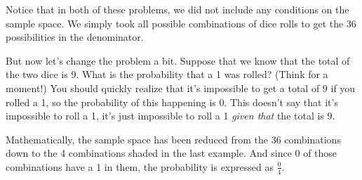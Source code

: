\documentclass{ximera}
\begin{document}
Notice that in both of these problems, we did not include any conditions on the sample space. We simply took all possible combinations of dice rolls to get the 36 possibilities in the denominator. 

But now let's change the problem a bit. Suppose that we know that the total of the two dice is 9. What is the probability that a 1 was rolled? (Think for a moment!) You should quickly realize that it's impossible to get a total of 9 if you rolled a 1, so the probability of this happening is 0. This doesn't say that it's impossible to roll a 1, it's just impossible to roll a 1 \emph{given that} the total is 9.

Mathematically, the sample space has been reduced from the 36 combinations down to the 4 combinations shaded in the last example. And since 0 of those combinations have a 1 in them, the probability is expressed as $\frac{0}{4}$.
\end{document}
